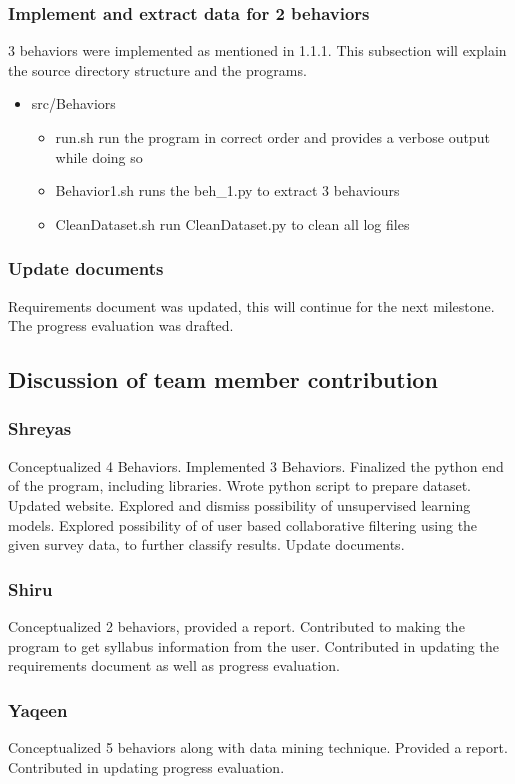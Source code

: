 \documentclass[12pt]{article}
\begin{document}
		\subsubsection{Implement and extract data for 2 behaviors}
		3 behaviors were implemented as mentioned in 1.1.1. This subsection will explain the source directory structure and the programs.
		\begin{itemize}
			\item src/Behaviors
			\begin{itemize}
				\item run.sh run the program in correct order and provides a verbose output while doing so
				\item Behavior1.sh runs the beh\_1.py to extract 3 behaviours
				\item CleanDataset.sh run CleanDataset.py to clean all log files
			\end{itemize}
		\end{itemize}
		\subsubsection{Update documents}
		Requirements document was updated, this will continue for the next milestone. The progress evaluation was drafted.
		
	\subsection{Discussion of team member contribution}
	\subsubsection{Shreyas}
		Conceptualized 4 Behaviors. Implemented 3 Behaviors. Finalized the python end of the program, including libraries. Wrote python script to prepare dataset. Updated website. Explored and dismiss possibility of unsupervised learning models. Explored possibility of of user based collaborative filtering using the given survey data, to further classify results. Update documents.
	\subsubsection{Shiru}
	Conceptualized 2 behaviors, provided a report. Contributed to making the program to get syllabus information from the user. Contributed in updating the requirements document as well as progress evaluation.
	\subsubsection{Yaqeen}
	Conceptualized 5 behaviors along with data mining technique. Provided a report. Contributed in updating progress evaluation.
\end{document}

